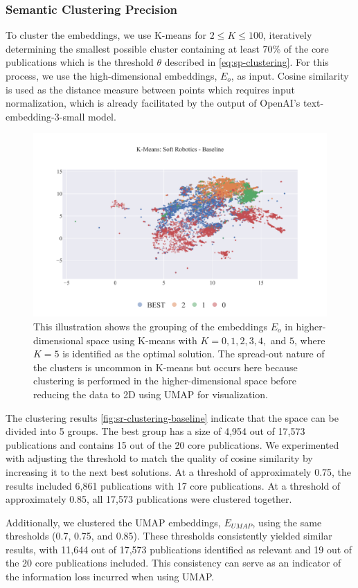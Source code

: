 \subsubsection{Semantic Clustering Precision}

To cluster the embeddings, we use K-means for $2 \leq K \leq 100$, iteratively determining the smallest possible cluster containing at least 70\% of the core publications which is the threshold $\theta$ described in \autoref{eq:sp-clustering}. For this process, we use the high-dimensional embeddings, $E_o$, as input. Cosine similarity is used as the distance measure between points which requires input normalization, which is already facilitated by the output of OpenAI's text-embedding-3-small model.

\begin{figure}[!hb]
	\centering	
	\includegraphics[scale=0.6]{pics/sr-clustering-baseline.pdf}
	\caption[Semantic Clustering Soft Robotics]{This illustration shows the grouping of the embeddings $E_o$ in higher-dimensional space using K-means with $K = 0, 1, 2, 3, 4,$ and $5$, where $K=5$ is identified as the optimal solution. The spread-out nature of the clusters is uncommon in K-means but occurs here because clustering is performed in the higher-dimensional space before reducing the data to 2D using UMAP for visualization.}\label{fig:sr-clustering-baseline}
\end{figure}

The clustering results \autoref{fig:sr-clustering-baseline} indicate that the space can be divided into 5 groups. The best group has a size of 4,954 out of 17,573 publications and contains 15 out of the 20 core publications. We experimented with adjusting the threshold to match the quality of cosine similarity by increasing it to the next best solutions. At a threshold of approximately 0.75, the results included 6,861 publications with 17 core publications. At a threshold of approximately 0.85, all 17,573 publications were clustered together.

Additionally, we clustered the UMAP embeddings, $E_{UMAP}$, using the same thresholds (0.7, 0.75, and 0.85). These thresholds consistently yielded similar results, with 11,644 out of 17,573 publications identified as relevant and 19 out of the 20 core publications included. This consistency can serve as an indicator of the information loss incurred when using UMAP.
